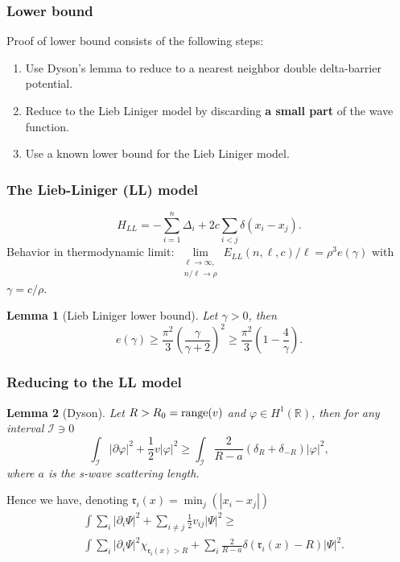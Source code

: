 \documentclass{beamer}[10]
\newcommand{\abs}[1]{\left\lvert #1 \right\rvert}
\newcommand{\R}{\mathbb{R}}
\newtheorem{mlemma}{Lemma}
\begin{document}
\begin{frame}
	\frametitle{Lower bound}
	Proof of lower bound consists of the following steps:
	\begin{enumerate}
		\item Use Dyson's lemma to reduce to a nearest neighbor double delta-barrier potential.
		\item Reduce to the Lieb Liniger model by discarding \textbf{a small part} of the wave function.
		\item Use a known lower bound for the Lieb Liniger model.
	\end{enumerate}	
\end{frame}

\begin{frame}
	\frametitle{The Lieb-Liniger (LL) model}
	\begin{block}{}
	\begin{equation}
	H_{LL}=-\sum_{i=1}^{n}\Delta_i+2c\sum_{i<j}\delta(x_i-x_j).
	\end{equation}
	Behavior in thermodynamic limit: $ \lim\limits_{\substack{\ell\to\infty,\\ n/\ell\to \rho}}E_{LL}(n,\ell,c)/\ell=\rho^3 e(\gamma) $ with $ \gamma=c/\rho  $.
		\begin{mlemma}[Lieb Liniger lower bound] \label{LemmaLL-LowerBound}
			Let $ \gamma>0 $, then
			\begin{equation}
			e(\gamma)\geq \frac{\pi^2}{3}\left(\frac{\gamma}{\gamma+2}\right)^2\geq \frac{\pi^2}{3}\left(1-\frac{4}{\gamma}\right).
			\end{equation}
		\end{mlemma}
	\end{block}	
\end{frame}

\begin{frame}
	\frametitle{Reducing to the LL model}
	\begin{block}{}
		\vspace{-0.5cm}
	\begin{mlemma}[Dyson]\label{LemmaDyson} Let $ R>R_0=\textnormal{range}(v) $ and $ \varphi\in H^1(\R) $, then for any interval $ \mathcal{I}\ni 0 $ 
		\begin{equation}
		\int_{\mathcal{I}} \abs{\partial \varphi}^2+\frac12 v\abs{\varphi}^2\geq \int_{\mathcal{I}}\frac{2}{R-a}\left(\delta_R+\delta_{-R}\right)\abs{\varphi}^2,
		\end{equation}
		where $ a $ is the s-wave scattering length.
	\end{mlemma}
	Hence we have, denoting $ \mathfrak{r}_{i}(x)=\min_j(\abs{x_i-x_j}) $ \begin{equation}
	\begin{aligned}
	&\int \sum_{i}\abs{\partial_i\Psi}^2+\sum_{i\neq j} \frac{1}{2}v_{ij}\abs{\Psi}^2\geq\\ &\int\sum_{i}\abs{\partial_i\Psi}^2\chi_{\mathfrak{r}_i(x)>R}+\sum_{i}\frac{2}{R-a}\delta(\mathfrak{r}_i(x)-R)\abs{\Psi}^2.
	\end{aligned}
	\end{equation}	
	\end{block}	
\end{frame}
\end{document}
